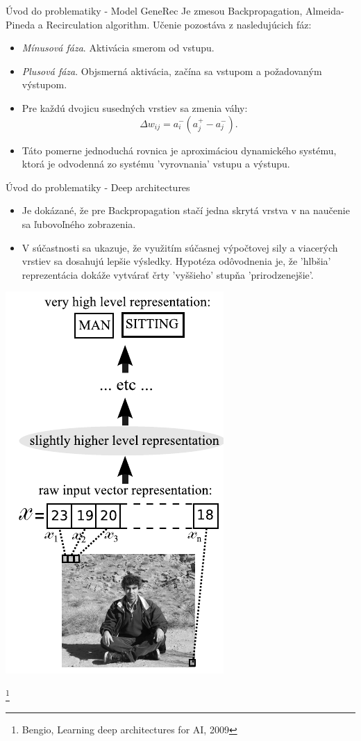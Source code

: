 \documentclass[xcolor=dvipsnames]{beamer}
\begin{document}
\begin{frame}{Úvod do problematiky - Model GeneRec}
Je zmesou Backpropagation, Almeida-Pineda a Recirculation algorithm. Učenie pozostáva z nasledujúcich fáz: 
  \begin{itemize}
    \item \emph{Mínusová fáza}. Aktivácia smerom od vstupu. 
    \item \emph{Plusová fáza}. Objsmerná aktivácia, začína sa vstupom a požadovaným výstupom. 
    \item Pre každú dvojicu susedných vrstiev sa zmenia váhy: 
    $$\Delta w_{ij} = a_i^{-}(a_j^{+} - a_j^{-}).$$
    \item Táto pomerne jednoduchá rovnica je aproximáciou dynamického systému, ktorá je odvodenná zo systému 'vyrovnania' vstupu a výstupu. 
  \end{itemize}
\end{frame}

\begin{frame}{Úvod do problematiky - Deep architectures}
  \begin{itemize}
  \item Je dokázané, že pre Backpropagation stačí jedna skrytá vrstva v na naučenie sa ľubovoľného zobrazenia. 
  \item V súčastnosti sa ukazuje, že využitím súčasnej výpočtovej sily a viacerých vrstiev sa dosahujú lepšie výsledky. Hypotéza odôvodnenia je, že 'hlbšia' reprezentácia dokáže vytvárať črty 'vyššieho' stupňa 'prirodzenejšie'.  
  \end{itemize}
  \begin{center}
  \includegraphics[scale=0.2]{img/deep.png}
  \end{center}
  \footnote{Bengio, Learning deep architectures for AI, 2009}
\end{frame}
\end{document}
